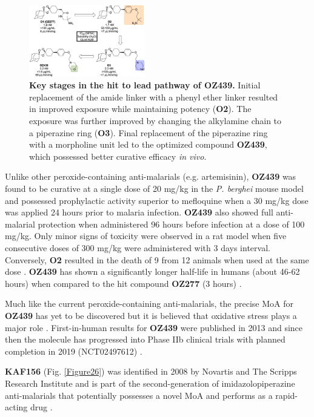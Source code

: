 \documentclass[twocolumn]{bmcart}%
\begin{document}
\begin{figure}[h]
	\includegraphics [width=0.45\textwidth] {Figure25}
	\caption{{\bf Key stages in the hit to lead pathway of OZ439.} Initial replacement of the amide linker with a phenyl ether linker resulted in improved exposure while maintaining potency (\textbf{O2}). The exposure was further improved by changing the alkylamine chain to a piperazine ring (\textbf{O3}). Final replacement of the piperazine ring with a morpholine unit led to the optimized compound \textbf{OZ439}, which possessed better curative efficacy \textit{in vivo}.}
	\label{Figure25}
\end{figure}

Unlike other peroxide-containing anti-malarials (e.g. artemisinin), \textbf{OZ439} was found to be curative at a single dose of 20 mg/kg in the \textit{P. berghei} mouse model and possessed prophylactic activity superior to mefloquine when a 30 mg/kg dose was applied 24 hours prior to malaria infection. \textbf{OZ439} also showed full anti-malarial protection when administered 96 hours before infection at a dose of 100 mg/kg. Only minor signs of toxicity were observed in a rat model when five consecutive doses of 300 mg/kg were administered with 3 days interval. Conversely, \textbf{O2} resulted in the death of 9 from 12 animals when used at the same dose \cite{Dong2017}. \textbf{OZ439} has shown a significantly longer half-life in humans (about 46-62 hours) when compared to the hit compound \textbf{OZ277} (3 hours) \cite{Phyo2016,Gautam2011,Valecha2012}.

Much like the current peroxide-containing anti-malarials, the precise MoA for \textbf{OZ439} has yet to be discovered but it is believed that oxidative stress plays a major role \cite{Jourdan2015,Allman2016}. First-in-human results for \textbf{OZ439} were published in 2013 \cite{Moehrle2013} and since then the molecule has progressed into Phase IIb clinical trials with planned completion in 2019 (NCT02497612) \cite{McCarthy2016}.

\hrulefill

\textbf{KAF156} (Fig. \ref{Figure26}) was identified in 2008 by Novartis and The Scripps Research Institute and is part of the second-generation of imidazolopiperazine anti-malarials that potentially possesses a novel MoA and performs as a rapid-acting drug \cite{Plouffe2008}.
\end{document}
